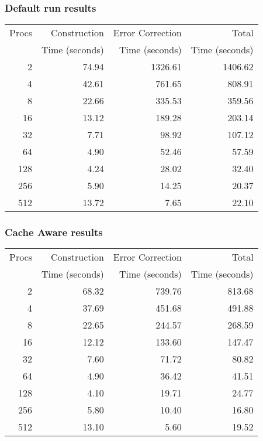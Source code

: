 \documentclass[integrals, nointegrals, article, 12pt, a4paper]{article}
\begin{document}
\subsubsection{Default run results}
\label{sec-3-2-2}

\begin{center}
\begin{tabular}{rrrr}
\hline
Procs & Construction & Error Correction & Total\\
 & Time (seconds) & Time (seconds) & Time (seconds)\\
\hline
2 & 74.94 & 1326.61 & 1406.62\\
4 & 42.61 & 761.65 & 808.91\\
8 & 22.66 & 335.53 & 359.56\\
16 & 13.12 & 189.28 & 203.14\\
32 & 7.71 & 98.92 & 107.12\\
64 & 4.90 & 52.46 & 57.59\\
128 & 4.24 & 28.02 & 32.40\\
256 & 5.90 & 14.25 & 20.37\\
512 & 13.72 & 7.65 & 22.10\\
\hline
\end{tabular}
\end{center}


\subsubsection{Cache Aware results}
\label{sec-3-2-3}

\begin{center}
\begin{tabular}{rrrr}
\hline
Procs & Construction & Error Correction & Total\\
 & Time (seconds) & Time (seconds) & Time (seconds)\\
\hline
2 & 68.32 & 739.76 & 813.68\\
4 & 37.69 & 451.68 & 491.88\\
8 & 22.65 & 244.57 & 268.59\\
16 & 12.12 & 133.60 & 147.47\\
32 & 7.60 & 71.72 & 80.82\\
64 & 4.90 & 36.42 & 41.51\\
128 & 4.10 & 19.71 & 24.77\\
256 & 5.80 & 10.40 & 16.80\\
512 & 13.10 & 5.60 & 19.52\\
\hline
\end{tabular}
\end{center}
\end{document}
